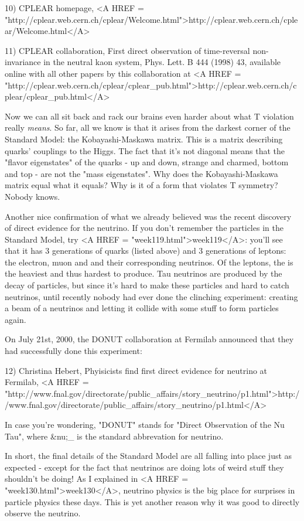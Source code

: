 10) CPLEAR homepage, <A HREF = "http://cplear.web.cern.ch/cplear/Welcome.html">http://cplear.web.cern.ch/cplear/Welcome.html</A>

11) CPLEAR collaboration, First direct observation of time-reversal 
non-invariance in the neutral kaon system, Phys. Lett. B 444 (1998) 43,
available online with all other papers by this collaboration at
<A HREF = "http://cplear.web.cern.ch/cplear/cplear_pub.html">http://cplear.web.cern.ch/cplear/cplear_pub.html</A>

Now we can all sit back and rack our brains even harder about what
T violation really \emph{means}.  So far, all we know is that it arises
from the darkest corner of the Standard Model: the Kobayashi-Maskawa 
matrix.  This is a matrix describing quarks' couplings to the Higgs.
The fact that it's not diagonal means that the "flavor eigenstates"
of the quarks - up and down, strange and charmed, bottom and top - 
are not the "mass eigenstates".   Why does the Kobayashi-Maskawa 
matrix equal what it equals?   Why is it of a form that violates 
T symmetry?  Nobody knows.

Another nice confirmation of what we already believed was the recent
discovery of direct evidence for the \tau  neutrino.  If you don't
remember the particles in the Standard Model, try <A HREF = "week119.html">week119</A>: you'll
see that it has 3 generations of quarks (listed above) and 3 generations 
of leptons: the electron, muon and \tau  and their corresponding neutrinos.
Of the leptons, the \tau  is the heaviest and thus hardest to produce.  Tau 
neutrinos are produced by the decay of \tau  particles, but since it's hard
to make these particles and hard to catch neutrinos, until recently nobody 
had ever done the clinching experiment: creating a beam of a \tau  neutrinos 
and letting it collide with some stuff to form \tau  particles again.   

On July 21st, 2000, the DONUT collaboration at Fermilab announced that 
they had successfully done this experiment:

12) Christina Hebert, Phyisicists find first direct evidence for \tau 
neutrino at Fermilab, 
<A HREF = "http://www.fnal.gov/directorate/public_affairs/story_neutrino/p1.html">http://www.fnal.gov/directorate/public_affairs/story_neutrino/p1.html</A>

In case you're wondering, "DONUT" stands for "Direct Observation of 
the Nu Tau", where &nu;_{\tau } is the standard abbrevation for \tau  neutrino.

In short, the final details of the Standard Model are all falling
into place just as expected - except for the fact that neutrinos are
doing lots of weird stuff they shouldn't be doing!  As I explained in 
<A HREF = "week130.html">week130</A>, neutrino physics is the big place for surprises in particle
physics these days.  This is yet another reason why it was good to 
directly observe the \tau  neutrino.

